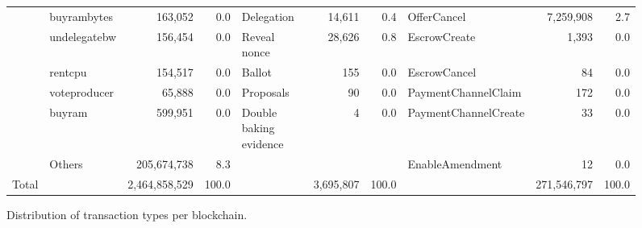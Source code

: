 \begin{figure*}[tbp]
\begin{tabular}{@{}lp{0.7in}rrp{1.2in}rrp{0.9in}rr@{}}
      & buyrambytes &                                  163,052  &                 0.0  & Delegation &                       14,611  &                 0.4  & OfferCancel &                         7,259,908  &                 2.7  \\
      & undelegatebw &                                  156,454  &                 0.0  & Reveal nonce &                       28,626  &                 0.8  & EscrowCreate &                                 1,393  &                 0.0  \\
      & rentcpu &                                  154,517  &                 0.0  & Ballot &                             155  &                 0.0  & EscrowCancel &                                      84  &                 0.0  \\
      & voteproducer &                                    65,888  &                 0.0  & Proposals &                               90  &                 0.0  & PaymentChannelClaim &                                    172  &                 0.0  \\
      & buyram &                                  599,951  &                 0.0  & Double baking evidence &                                 4  &                 0.0  & PaymentChannelCreate &                                      33  &                 0.0  \\
      & Others &                          205,674,738  &                 8.3  &   &   &   & EnableAmendment &                                      12  &                 0.0  \\
    \midrule
    \midrule
    Total &   &                       2,464,858,529  &            100.0  &   &                 3,695,807  &            100.0  &   &                    271,546,797  &            100.0  \\
    \bottomrule
    \end{tabular}
    \caption{Distribution of transaction types per blockchain.}
    \label{tab:transaction-types-distribution}%
\end{figure*}






